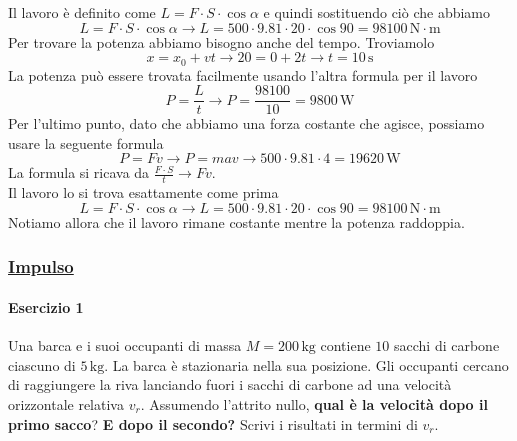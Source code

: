 \divisor

Il lavoro è definito come $L = F\cdot S\cdot \cos\alpha$ e quindi sostituendo ciò che abbiamo
\begin{equation*}
L = F\cdot S\cdot \cos\alpha \rightarrow L = 500\cdot9.81\cdot20\cdot\cos90 = 
\boxed{98100\,\text{N}\cdot\text{m}}
\end{equation*}
Per trovare la potenza abbiamo bisogno anche del tempo. Troviamolo
\begin{equation*}
x = x_0 +vt \rightarrow 20 = 0+2t \rightarrow t = 10\,\text{s}
\end{equation*}
La potenza può essere trovata facilmente usando l'altra formula per il lavoro
\begin{equation*}
P = \frac{L}{t} \rightarrow P = \frac{98100}{10} = \boxed{9800\,\text{W}}
\end{equation*}
Per l'ultimo punto, dato che abbiamo una forza costante che agisce, possiamo usare la seguente formula
\begin{equation*}
P = Fv \rightarrow P = mav\rightarrow 500\cdot9.81\cdot4 = \boxed{19620\,\text{W}}
\end{equation*}
La formula si ricava da $\frac{F\cdot S}{t}\rightarrow Fv$.\\
Il lavoro lo si trova esattamente come prima
\begin{equation*}
L = F\cdot S\cdot \cos\alpha \rightarrow L = 500\cdot9.81\cdot20\cdot\cos90 = 
\boxed{98100\,\text{N}\cdot\text{m}}
\end{equation*}
Notiamo allora che il lavoro rimane costante mentre la potenza raddoppia.

\subsubsection*{\hyperref[subsec:dinamica:impulso]{Impulso}}\label{ex:impulso}
\paragraph{Esercizio 1}
Una barca e i suoi occupanti di massa $M = 200\,\text{kg}$ contiene $10$ sacchi di carbone ciascuno di
$5\,\text{kg}$. La barca è stazionaria nella sua posizione. Gli occupanti cercano di raggiungere la
riva lanciando fuori i sacchi di carbone ad una velocità orizzontale relativa $v_r$. Assumendo 
l'attrito nullo, \textbf{qual è la velocità dopo il primo sacco}? \textbf{E dopo il secondo?} Scrivi
i risultati in termini di $v_r$.
\divisor

